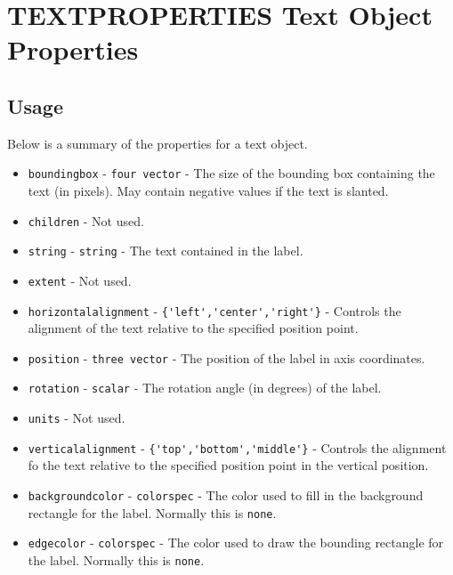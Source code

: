 \section{TEXTPROPERTIES Text Object Properties}

\subsection{Usage}

Below is a summary of the properties for a text object.
\begin{itemize}
\item  \verb|boundingbox| - \verb|four vector| - The size of the bounding
 box containing the text (in pixels).  May contain negative values
 if the text is slanted.

\item  \verb|children| - Not used.

\item  \verb|string| - \verb|string| - The text contained in the label.

\item  \verb|extent| - Not used.

\item  \verb|horizontalalignment| - \verb|{'left','center','right'}| - Controls the 
 alignment of the text relative to the specified position point.

\item  \verb|position| - \verb|three vector| - The position of the label in axis
 coordinates.

\item  \verb|rotation| - \verb|scalar| - The rotation angle (in degrees) of the label.

\item  \verb|units| - Not used.

\item  \verb|verticalalignment| - \verb|{'top','bottom','middle'}| - Controls the
 alignment fo the text relative to the specified position point in the
 vertical position.

\item  \verb|backgroundcolor| - \verb|colorspec| - The color used to fill in the background
 rectangle for the label.  Normally this is \verb|none|.

\item  \verb|edgecolor| - \verb|colorspec| - The color used to draw the bounding rectangle
 for the label.  Normally this is \verb|none|.


\end{itemize}

